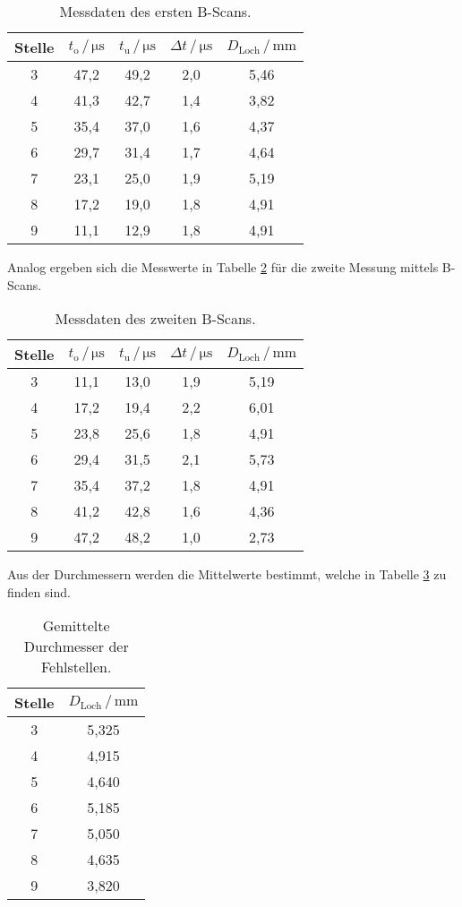\begin{table}
\centering
\caption{Messdaten des ersten B-Scans.}
\label{tab:mess3}
\begin{tabular}{c c c c c}
\toprule
Stelle & $t_\text{o} \,/\, \si{\micro\second}$ & $t_\text{u} \,/\, \si{\micro\second}$ &$\Delta t \,/\, \si{\micro\second}$ & $D_\text{Loch} \,/\, \si{\milli\meter}$\\
\midrule 
3 & 47,2 & 49,2 & 2,0 & 5,46\\
4 & 41,3 & 42,7 & 1,4 & 3,82\\
5 & 35,4 & 37,0 & 1,6 & 4,37\\
6 & 29,7 & 31,4 & 1,7 & 4,64\\
7 & 23,1 & 25,0 & 1,9 & 5,19\\
8 & 17,2 & 19,0 & 1,8 & 4,91\\
9 & 11,1 & 12,9 & 1,8 & 4,91\\
\bottomrule
\end{tabular}
\end{table}

Analog ergeben sich die Messwerte in Tabelle \ref{tab:mess4} für die zweite Messung mittels B-Scans.

\begin{table}
\centering
\caption{Messdaten des zweiten B-Scans.}
\label{tab:mess4}
\begin{tabular}{c c c c c}
\toprule
Stelle & $t_\text{o} \,/\, \si{\micro\second}$ & $t_\text{u} \,/\, \si{\micro\second}$ &$\Delta t \,/\, \si{\micro\second}$ & $D_\text{Loch} \,/\, \si{\milli\meter}$\\
\midrule 
3 & 11,1 & 13,0 & 1,9 & 5,19\\
4 & 17,2 & 19,4 & 2,2 & 6,01\\
5 & 23,8 & 25,6 & 1,8 & 4,91\\
6 & 29,4 & 31,5 & 2,1 & 5,73\\
7 & 35,4 & 37,2 & 1,8 & 4,91\\
8 & 41,2 & 42,8 & 1,6 & 4,36\\
9 & 47,2 & 48,2 & 1,0 & 2,73\\
\bottomrule
\end{tabular}
\end{table}

Aus der Durchmessern werden die Mittelwerte bestimmt, welche in Tabelle \ref{tab:mess5} zu finden sind. 

\begin{table}
\centering
\caption{Gemittelte Durchmesser der Fehlstellen.}
\label{tab:mess5}
\begin{tabular}{c c}
\toprule
Stelle & $D_\text{Loch} \,/\, \si{\milli\meter}$\\
\midrule 
3 & 5,325\\
4 & 4,915\\
5 & 4,640\\
6 & 5,185\\
7 & 5,050\\
8 & 4,635\\
9 & 3,820\\
\bottomrule
\end{tabular}
\end{table}

